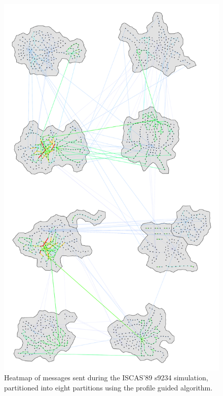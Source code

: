\documentclass[11pt]{book}
\begin{document}
\begin{figure}
\centering
\includegraphics[width=\textwidth,height=0.9\textheight,keepaspectratio]{figs/s9234_8part}
\caption{Heatmap of messages sent during the ISCAS'89 s9234 simulation, partitioned into eight partitions using the profile guided algorithm.}
\end{figure}
\end{document}
